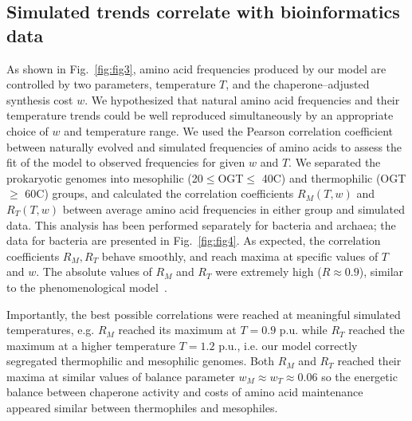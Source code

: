 \documentclass[10pt,letterpaper]{article}
\begin{document}
\subsection*{Simulated trends correlate with bioinformatics data}

As shown in Fig.~\ref{fig:fig3}, amino acid frequencies produced by our model are controlled by two parameters, temperature $T$, and the chaperone--adjusted synthesis cost $w$. We hypothesized that natural amino acid frequencies and their temperature trends could be well reproduced simultaneously by an appropriate choice of $w$ and temperature range. We used the Pearson correlation coefficient between naturally evolved and simulated frequencies of amino acids to assess the fit of the model to observed frequencies for given $w$ and $T$. We separated the prokaryotic genomes into mesophilic (20$\leq$OGT$\leq$ 40\textdegree C) and thermophilic (OGT$\geq$ 60\textdegree C) groups, and calculated the correlation coefficients $R_M(T,w)$ and $R_T(T,w)$ between average amino acid frequencies in either group and simulated data. This analysis has been performed separately for bacteria and archaea; the data for bacteria are presented in Fig.~\ref{fig:fig4}. As expected, the correlation coefficients $R_M, R_T$ behave smoothly, and reach maxima at specific values of $T$ and $w$. The absolute values of $R_M$ and $R_T$ were extremely high ($R\approx0.9$), similar to the phenomenological model~\cite{Krick2014Amino}. 

Importantly, the best possible correlations were reached at meaningful simulated temperatures, e.g. $R_M$ reached its maximum at $T=0.9$ p.u. while $R_T$ reached the maximum at a higher temperature $T=1.2$ p.u., i.e. our model correctly segregated thermophilic and mesophilic genomes. Both $R_M$ and $R_T$ reached their maxima at similar values of balance parameter $w_M\approx w_T \approx 0.06$ so the energetic balance between chaperone activity and costs of amino acid maintenance appeared similar between thermophiles and mesophiles.
\end{document}
